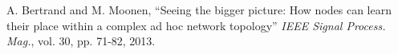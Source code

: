 \documentclass[12pt,twoside,a4paper,fleqn,bibliography=totocnumbered]{report}
\begin{document}

\setcounter{page}{1}
\cleardoublepage

\tableofcontents
\cleardoublepage
{}
\setcounter{page}{1}








\cleardoublepage
{}
%
%    	             

\begin{thebibliography}{1}

 A. Bertrand and M. Moonen, ``Seeing the bigger picture: How nodes can learn their place within a complex ad hoc network topology'' \emph{IEEE Signal Process. Mag.}, vol. 30, pp. 71-82, 2013.



\end{thebibliography}
\end{document}
